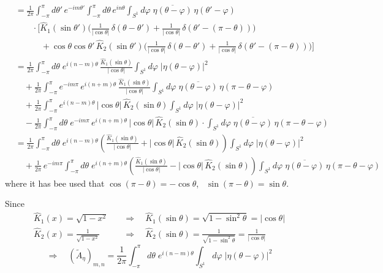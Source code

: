 \documentclass[11pt]{article}
\newcommand{\conj}[1]{\overline{#1}}
\begin{document}
\begin{align*}
  &=\frac{1}{2\pi}\int_{-\pi}^{\pi}d\theta'\,e^{-im\theta'}
    \int_{-\pi}^{\pi}d\theta\,e^{in\theta}
    \int_{S^1}d\varphi\;\conj{\eta(\theta-\varphi)}\,\eta(\theta'-\varphi)\\
  &\qquad\cdot\Big[\hat K_1(\sin\theta')\Big(\frac{1}{|\cos\theta|}\,\delta(\theta-\theta')
    +\frac{1}{|\cos\theta|}\,\delta(\theta'-(\pi-\theta))\Big)\\
  &\qquad\quad+\cos\theta\cos\theta'\,\hat K_2(\sin\theta')
    \Big(\frac{1}{|\cos\theta|}\,\delta(\theta-\theta')
    +\frac{1}{|\cos\theta|}\,\delta(\theta'-(\pi-\theta))\Big)\Big]\\[4pt]
  &=\frac{1}{2\pi}\int_{-\pi}^{\pi}d\theta\;e^{i(n-m)\theta}\,
    \frac{\hat K_1(\sin\theta)}{|\cos\theta|}\int_{S^1}d\varphi\;|\eta(\theta-\varphi)|^2\\
  &\quad+\frac{1}{2\pi}\int_{-\pi}^{\pi}e^{-im\pi}\,e^{i(n+m)\theta}\,
    \frac{\hat K_1(\sin\theta)}{|\cos\theta|}\int_{S^1}d\varphi\;
    \conj{\eta(\theta-\varphi)}\,\eta(\pi-\theta-\varphi)\\
  &\quad+\frac{1}{2\pi}\int_{-\pi}^{\pi}e^{i(n-m)\theta}\,|\cos\theta|\,
    \hat K_2(\sin\theta)\int_{S^1}d\varphi\;|\eta(\theta-\varphi)|^2\\
  &\quad-\frac{1}{2\pi}\int_{-\pi}^{\pi}d\theta\;e^{-im\pi}\,e^{i(n+m)\theta}\,
    |\cos\theta|\,\hat K_2(\sin\theta)\cdot\int_{S^1}d\varphi\;
    \conj{\eta(\theta-\varphi)}\,\eta(\pi-\theta-\varphi)\\[4pt]
  &=\frac{1}{2\pi}\int_{-\pi}^{\pi}d\theta\;e^{i(n-m)\theta}
    \left(\frac{\hat K_1(\sin\theta)}{|\cos\theta|}+|\cos\theta|\,\hat K_2(\sin\theta)\right)
    \int_{S^1}d\varphi\;|\eta(\theta-\varphi)|^2\\
  &\quad+\frac{1}{2\pi}\,e^{-im\pi}\int_{-\pi}^{\pi}d\theta\;e^{i(n+m)\theta}
    \left(\frac{\hat K_1(\sin\theta)}{|\cos\theta|}-|\cos\theta|\,\hat K_2(\sin\theta)\right)
    \int_{S^1}d\varphi\;\conj{\eta(\theta-\varphi)}\,\eta(\pi-\theta-\varphi)
\end{align*}
where it has bee used that $\cos(\pi-\theta)=-\cos\theta$, \ $\sin(\pi-\theta)=\sin\theta$.

Since
\begin{align*}
  \hat K_1(x)=\sqrt{1-x^2}\quad&\Rightarrow\quad
  \hat K_1(\sin\theta)=\sqrt{1-\sin^2\theta}=|\cos\theta|\\
  \hat K_2(x)=\frac{1}{\sqrt{1-x^2}}\quad&\Rightarrow\quad
  \hat K_2(\sin\theta)=\frac{1}{\sqrt{1-\sin^2\theta}}=\frac{1}{|\cos\theta|}
\end{align*}
\[
  \Rightarrow\quad (\tilde{A}_{\eta})_{m,n}=\frac{1}{2\pi}\int_{-\pi}^{\pi}d\theta\;e^{i(n-m)\theta}
  \int_{S^1}d\varphi\;|\eta(\theta-\varphi)|^2
\]
\end{document}
